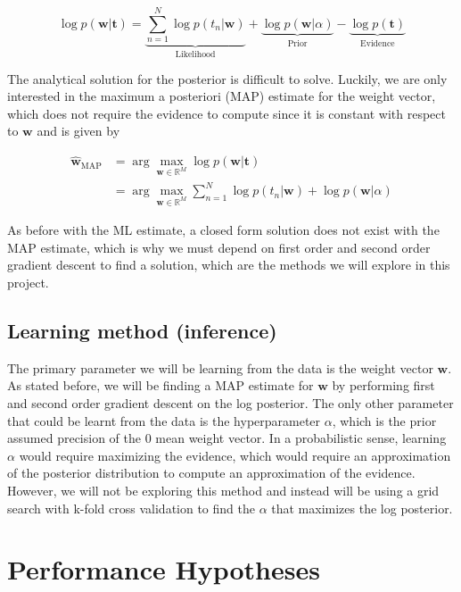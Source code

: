 \documentclass[12pt]{article}
\begin{document}
\begin{equation}
    \log p(\textbf{w}|\textbf{t}) = \underbrace{\sum_{n=1}^N \log p(t_n|\textbf{w})}_{\mathrm{Likelihood}} + \underbrace{\log p(\textbf{w}|\alpha)}_{\mathrm{Prior}} - \underbrace{\log p(\textbf{t})}_{\mathrm{Evidence}}
\end{equation}

The analytical solution for the posterior is difficult to solve. Luckily, we are only interested in the maximum a posteriori (MAP) estimate for the weight vector, which does not require the evidence to compute since it is constant with respect to $\mathbf{w}$ and is given by

\begin{align}
    \hat{\textbf{w}}_{\mathrm{MAP}} &= \arg\max_{\textbf{w} \in \mathbb{R}^M} \log p(\textbf{w}|\textbf{t}) \\
    &= \arg\max_{\textbf{w} \in \mathbb{R}^M} \sum_{n=1}^N \log p(t_n|\textbf{w}) + \log p(\textbf{w}|\alpha)
\end{align}

As before with the ML estimate, a closed form solution does not exist with the MAP estimate, which is why we must depend on first order and second order gradient descent to find a solution, which are the methods we will explore in this project.

\subsection{Learning method (inference)}

The primary parameter we will be learning from the data is the weight vector $\textbf{w}$. As stated before, we will be finding a MAP estimate for $\textbf{w}$ by performing first and second order gradient descent on the log posterior. The only other parameter that could be learnt from the data is the hyperparameter $\alpha$, which is the prior assumed precision of the 0 mean weight vector. In a probabilistic sense, learning $\alpha$ would require maximizing the evidence, which would require an approximation of the posterior distribution to compute an approximation of the evidence. However, we will not be exploring this method and instead will be using a grid search with k-fold cross validation to find the $\alpha$ that maximizes the log posterior.

\section{Performance Hypotheses}
\end{document}
